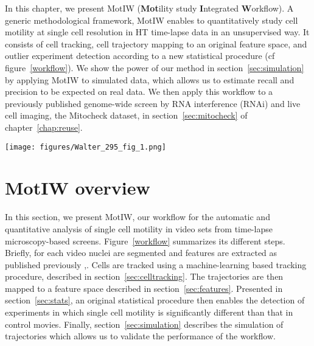 
In this chapter, we present MotIW (\textbf{Mot}ility study \textbf{I}ntegrated \textbf{W}orkflow). A generic methodological framework, MotIW enables to quantitatively study cell motility at single cell resolution in HT time-lapse data in an unsupervised way. It consists of cell tracking, cell trajectory mapping to an original feature space, and outlier experiment detection according to a new statistical procedure (cf figure~\ref{workflow}). We show the power of our method in section~\ref{sec:simulation} by applying MotIW to simulated data, which allows us to estimate recall and precision to be expected on real data. We then apply this workflow to a previously published genome-wide screen by RNA interference (RNAi) and live cell imaging, the Mitocheck dataset, in section~\ref{sec:mitocheck} of chapter~\ref{chap:reuse}.

\begin{figure*}[ht]
\centerline{\texttt{[image: figures/Walter\_295\_fig\_1.png]}}
\caption{Overview of MotIW}
\label{workflow}
\end{figure*}  

\section{MotIW overview}
\label{sec:workflow}
In this section, we present MotIW, our workflow for the automatic and
quantitative analysis of single cell motility in video sets from
time-lapse microscopy-based screens. Figure~\ref{workflow} summarizes
its different steps. 
Briefly, for each video nuclei are segmented and features are
extracted as published previously \cite{Walter2010},\cite{cellcognition}. Cells are tracked using a
machine-learning based tracking procedure, described in
section~\ref{sec:celltracking}. The trajectories are then mapped to a
feature space described in section~\ref{sec:features}. Presented in
section~\ref{sec:stats}, an original statistical procedure then
enables the detection of experiments in which single cell motility is
significantly different than that in control movies. Finally,
section~\ref{sec:simulation} describes the simulation of trajectories
which allows us to validate the performance of the workflow.

